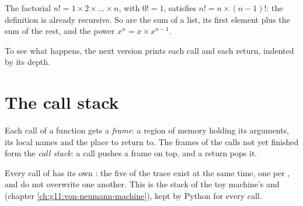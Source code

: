 The factorial $n! = 1 \times 2 \times \dots \times n$, with $0! = 1$, satisfies $n! = n \times (n - 1)!$: the
definition is already recursive. So are the sum of a list, its first element plus the sum of the rest, and the power
$x^n = x \times x^{n-1}$.

\label{lst:g12:recursion:factorial}

\label{out:g12:recursion:factorial}

To see what happens, the next version prints each call and each return, indented by its depth.

\label{lst:g12:recursion:trace}

\label{out:g12:recursion:trace}

\section{The call stack}\label{sec:g12:recursion:stack}

\begin{definition}\label{def:g12:recursion:call-stack}
Each call of a function gets a \emph{frame}: a region of memory holding its arguments, its
local names and the place to return to. The frames of the calls not yet finished form the \emph{call
stack}: a call pushes a frame on top, and a return pops it.
\end{definition}

Every call of  has its own : the five  of the trace exist at the same time, one per
, and do not overwrite one another. This is the stack of the toy machine's  and  (chapter
\ref{ch:g11:von-neumann-machine}), kept by Python for every call.

